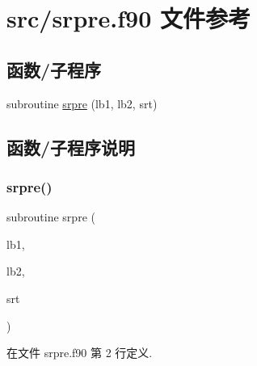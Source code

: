 \hypertarget{srpre_8f90}{}\section{src/srpre.f90 文件参考}
\label{srpre_8f90}
\subsection*{函数/子程序}
\begin{DoxyCompactItemize}
\item 
subroutine \mbox{\hyperlink{srpre_8f90_aa6d8bed16c3c5865e6897a067bd6c61a}{srpre}} (lb1, lb2, srt)
\end{DoxyCompactItemize}


\subsection{函数/子程序说明}
\mbox{\label{srpre_8f90_aa6d8bed16c3c5865e6897a067bd6c61a}} 
\subsubsection{\texorpdfstring{srpre()}{srpre()}}
{\footnotesize\ttfamily subroutine srpre (\begin{DoxyParamCaption}\item[{}]{lb1,  }\item[{}]{lb2,  }\item[{}]{srt }\end{DoxyParamCaption})}



在文件 srpre.\+f90 第 2 行定义.


